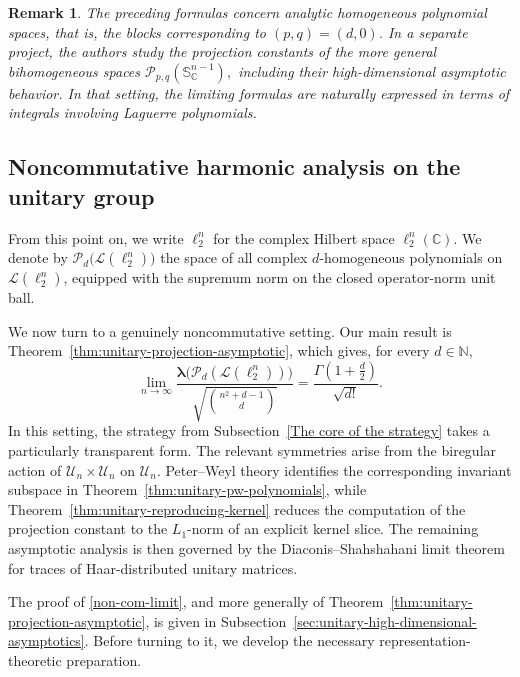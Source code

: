 \documentclass[11pt,showkeys]{amsart}
\newtheorem{remark}[theorem]{Remark}
\begin{document}
\begin{remark}
The preceding formulas concern analytic homogeneous polynomial spaces,
that is, the blocks corresponding to \((p,q)=(d,0)\). In a separate
project, the authors study the projection constants of the more
general bihomogeneous spaces
\(
    \mathcal P_{p,q}(\mathbb S_{\mathbb C}^{n-1}),
\)
including their high-dimensional asymptotic behavior. In that setting,
the limiting formulas are naturally expressed in terms of integrals
involving Laguerre polynomials.
\end{remark}





\subsection{Noncommutative harmonic analysis on the unitary group}
\label{sec:unitary-group-application}

From this point on, we write \(\ell_2^n\) for the complex Hilbert space
\(\ell_2^n(\mathbb C)\). We denote by
\(\mathcal P_d\bigl(\mathcal L(\ell_2^n)\bigr)\) the space of all complex
\(d\)-homogeneous polynomials on \(\mathcal L(\ell_2^n)\), equipped with
the supremum norm on the closed operator-norm unit ball.

We now turn to a genuinely noncommutative setting. Our main result is
Theorem~\ref{thm:unitary-projection-asymptotic}, which gives, for every
\(d\in\mathbb N\),
\begin{equation}
\label{non-com-limit}
    \lim_{n\to\infty}
    \frac{
        \boldsymbol{\lambda}
        \bigl(\mathcal P_d(\mathcal L(\ell_2^n))\bigr)
    }{
        \sqrt{\binom{n^2+d-1}{d}}
    }
    =
    \frac{\Gamma\left(1+\frac d2\right)}{\sqrt{d!}}.
\end{equation}
In this setting, the strategy from Subsection~\ref{The core of the strategy} takes a particularly
transparent form. The relevant symmetries arise from the biregular
action of \(\mathcal U_n\times\mathcal U_n\) on \(\mathcal U_n\).
Peter--Weyl theory identifies the corresponding invariant subspace in
Theorem~\ref{thm:unitary-pw-polynomials}, while
Theorem~\ref{thm:unitary-reproducing-kernel} reduces the computation of
the projection constant to the \(L_1\)-norm of an explicit kernel
slice. The remaining asymptotic analysis is then governed by the
Diaconis--Shahshahani limit theorem
\cite{diaconis1994eigenvalues} for traces of Haar-distributed unitary
matrices.

The proof of \eqref{non-com-limit}, and more generally of
Theorem~\ref{thm:unitary-projection-asymptotic}, is given in
Subsection~\ref{sec:unitary-high-dimensional-asymptotics}. Before turning to it, we
develop the necessary representation-theoretic preparation.
\end{document}
